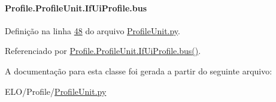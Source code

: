 \paragraph[{bus}]{\setlength{\rightskip}{0pt plus 5cm}Profile.\+Profile\+Unit.\+If\+Ui\+Profile.\+bus}\label{classProfile_1_1ProfileUnit_1_1IfUiProfile_a32a87d193e5d14e0ff3125d6bab2c420}


Definição na linha \hyperlink{ProfileUnit_8py_source_l00048}{48} do arquivo \hyperlink{ProfileUnit_8py_source}{Profile\+Unit.\+py}.



Referenciado por \hyperlink{classProfile_1_1ProfileUnit_1_1IfUiProfile_a4d1251e277cd197a636d9fa2aa463ca6}{Profile.\+Profile\+Unit.\+If\+Ui\+Profile.\+bus()}.



A documentação para esta classe foi gerada a partir do seguinte arquivo\+:\begin{DoxyCompactItemize}
\item 
E\+L\+O/\+Profile/\hyperlink{ProfileUnit_8py}{Profile\+Unit.\+py}\end{DoxyCompactItemize}
